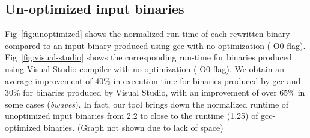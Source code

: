 \subsection{Un-optimized input binaries}
Fig~\ref{fig:unoptimized} shows the normalized run-time of each rewritten binary compared to an input binary produced using gcc with no optimization (-O0 flag). Fig~\ref{fig:visual-studio} shows the corresponding run-time for binaries produced using Visual Studio compiler with no optimization (-O0 flag). We obtain an average improvement of 40\% in execution time for binaries produced by gcc and 30\% for binaries produced by Visual Studio, with an improvement of over 65\% in some cases (\emph{bwaves}). In fact, our tool brings down the normalized runtime of unoptimized input binaries from 2.2 to close to the runtime (1.25) of gcc-optimized binaries. (Graph not shown due to lack of space)
%
%




